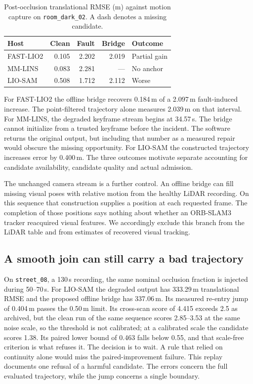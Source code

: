 \documentclass[conference]{IEEEtran}
\newcommand{\roomseq}{\texttt{room\_dark\_02}}
\newcommand{\streetseq}{\texttt{street\_08}}
\begin{document}
\begin{table}[t]
\centering
\caption{Post-occlusion translational RMSE (m) against motion capture on \roomseq{}. A dash denotes a missing candidate.}
\label{tab:room}
\begin{tabular}{@{}lrrrl@{}}
\toprule
Host & Clean & Fault & Bridge & Outcome\\
\midrule
FAST-LIO2 & 0.105 & 2.202 & 2.019 & Partial gain\\
MM-LINS   & 0.083 & 2.281 & ---   & No anchor\\
LIO-SAM   & 0.508 & 1.712 & 2.112 & Worse\\
\bottomrule
\end{tabular}
\end{table}

For FAST-LIO2 the offline bridge recovers 0.184\,m of a 2.097\,m fault-induced increase. The point-filtered trajectory alone measures 2.039\,m on that interval. For MM-LINS, the degraded keyframe stream begins at 34.57\,s. The bridge cannot initialize from a trusted keyframe before the incident. The software returns the original output, but including that number as a measured repair would obscure the missing opportunity. For LIO-SAM the constructed trajectory increases error by 0.400\,m. The three outcomes motivate separate accounting for candidate availability, candidate quality and actual admission.

The unchanged camera stream is a further control. An offline bridge can fill missing visual poses with relative motion from the healthy LiDAR recording. On this sequence that construction supplies a position at each requested frame. The completion of those positions says nothing about whether an ORB-SLAM3 tracker \cite{campos2021orbslam3} reacquired visual features. We accordingly exclude this branch from the LiDAR table and from estimates of recovered visual tracking.

\subsection{A smooth join can still carry a bad trajectory}
On \streetseq{}, a 130\,s recording, the same nominal occlusion fraction is injected during 50--70\,s. For LIO-SAM the degraded output has 333.29\,m translational RMSE and the proposed offline bridge has 337.06\,m. Its measured re-entry jump of 0.404\,m passes the 0.50\,m limit. Its cross-scan score of 4.415 exceeds 2.5 as archived, but the clean run of the same sequence scores 2.85--3.53 at the same noise scale, so the threshold is not calibrated; at a calibrated scale the candidate scores 1.38. Its paired lower bound of 0.463 falls below 0.55, and that scale-free criterion is what refuses it. The decision is to wait. A rule that relied on continuity alone would miss the paired-improvement failure. This replay documents one refusal of a harmful candidate. The errors concern the full evaluated trajectory, while the jump concerns a single boundary.
\end{document}

